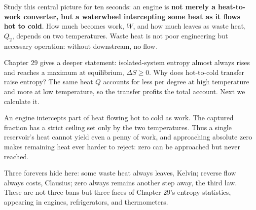 \begin{center}
\end{center}

Study this central picture for ten seconds: an engine is \textbf{not merely a heat-to-work converter, but a waterwheel intercepting some heat as it flows hot to cold}. How much becomes work, \(W\), and how much leaves as waste heat, \(Q_2\), depends on two temperatures. Waste heat is not poor engineering but necessary operation: without downstream, no flow.

Chapter 29 gives a deeper statement: isolated-system entropy almost always rises and reaches a maximum at equilibrium, \(\Delta S \geq 0\). Why does hot-to-cold transfer raise entropy? The same heat \(Q\) accounts for less per degree at high temperature and more at low temperature, so the transfer profits the total account. Next we calculate it.


\begin{oneline}
An engine intercepts part of heat flowing hot to cold as work. The captured fraction has a strict ceiling set only by the two temperatures. Thus a single reservoir's heat cannot yield even a penny of work, and approaching absolute zero makes remaining heat ever harder to reject: zero can be approached but never reached.
\end{oneline}

Three forevers hide here: some waste heat always leaves, Kelvin; reverse flow always costs, Clausius; zero always remains another step away, the third law. These are not three bans but three faces of Chapter 29's entropy statistics, appearing in engines, refrigerators, and thermometers.

